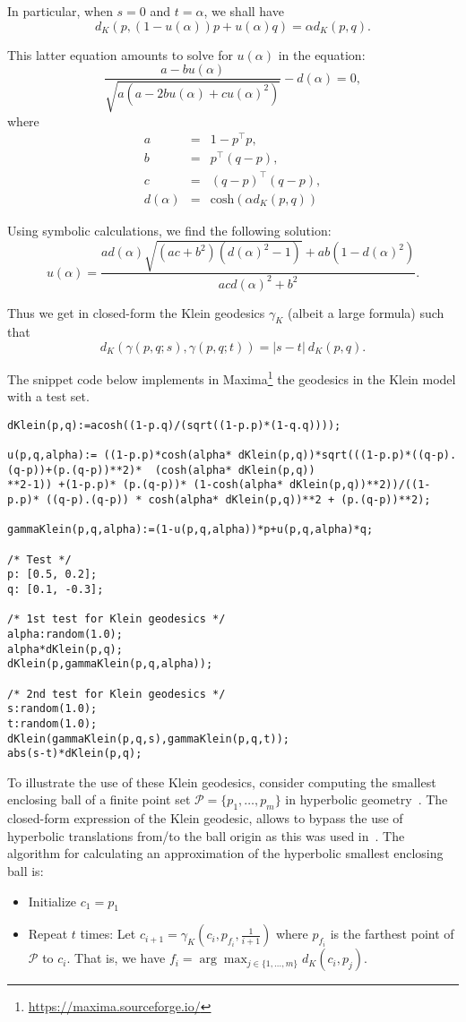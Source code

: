 \documentclass[11pt]{article}
\def\calP{\mathcal{P}}
\def\cosh{\mathrm{cosh}}
\begin{document}
In particular, when $s=0$ and $t=\alpha$, we shall have
$$
d_K\left(p,(1-u(\alpha)) p + u(\alpha)q\right)=\alpha d_K(p,q).
$$

This latter equation amounts to solve for $u(\alpha)$ in the equation:
$$
\frac{a-b u(\alpha)}{\sqrt{a(a-2b u(\alpha)+c u(\alpha)^2)}}-d(\alpha)=0,
$$
where
\begin{eqnarray*}
a &=& 1-p^\top p,\\
b &=& p^\top (q-p),\\
c &=& (q-p)^\top (q-p) ,\\
d(\alpha) &=& \cosh(\alpha d_K(p,q))
\end{eqnarray*}

Using symbolic calculations, we find the following solution:
\begin{equation}
u(\alpha) = \frac{   ad(\alpha) \sqrt{(ac+b^2)  (d(\alpha)^2-1)} +a b (1-d(\alpha)^2)}{a c d(\alpha)^2 + b^2}.
\end{equation}

Thus we get in closed-form the Klein geodesics $\gamma_K$ (albeit a large formula) such that
$$
d_K(\gamma(p,q;s),\gamma(p,q;t))= |s-t|\ d_K(p,q).
$$

The snippet code below implements in {\sc Maxima}\footnote{\url{https://maxima.sourceforge.io/}} the  geodesics in the Klein model with a test set.

\begin{lstlisting}
dKlein(p,q):=acosh((1-p.q)/(sqrt((1-p.p)*(1-q.q))));

u(p,q,alpha):= ((1-p.p)*cosh(alpha* dKlein(p,q))*sqrt(((1-p.p)*((q-p).(q-p))+(p.(q-p))**2)*  (cosh(alpha* dKlein(p,q))
**2-1)) +(1-p.p)* (p.(q-p))* (1-cosh(alpha* dKlein(p,q))**2))/((1-p.p)* ((q-p).(q-p)) * cosh(alpha* dKlein(p,q))**2 + (p.(q-p))**2);

gammaKlein(p,q,alpha):=(1-u(p,q,alpha))*p+u(p,q,alpha)*q;

/* Test */
p: [0.5, 0.2];
q: [0.1, -0.3];

/* 1st test for Klein geodesics */
alpha:random(1.0);
alpha*dKlein(p,q);
dKlein(p,gammaKlein(p,q,alpha));

/* 2nd test for Klein geodesics */
s:random(1.0);
t:random(1.0);
dKlein(gammaKlein(p,q,s),gammaKlein(p,q,t));
abs(s-t)*dKlein(p,q);
\end{lstlisting} 

To illustrate the use of these Klein geodesics, consider computing the smallest enclosing ball of a finite point set 
$\calP=\{p_1,\ldots,p_m\}$ in hyperbolic geometry~\cite{ArnaudonNielsen-2012}. 
The closed-form expression of the Klein geodesic, allows to bypass the use of hyperbolic translations from/to the ball origin as this was used  in~\cite{NielsenHadjeres-2015}.
The algorithm for calculating an approximation of the hyperbolic smallest enclosing ball is:
\begin{itemize}
\item Initialize $c_1=p_1$
\item Repeat $t$ times: Let $c_{i+1}=\gamma_K\left(c_i,p_{f_i},\frac{1}{i+1}\right)$ where $p_{f_i}$ is the farthest point of $\calP$ to $c_i$.
That is, we have $f_i=\arg\max_{j\in\{1,\ldots, m\}} d_K(c_i,p_j)$.
\end{itemize}
\end{document}
